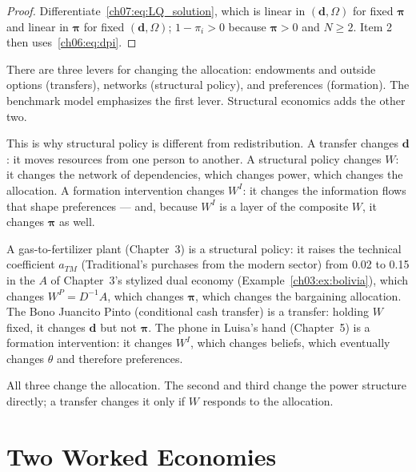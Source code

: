 \documentclass[../structural_economics_book.tex]{subfiles}
\begin{document}
\begin{proof}
Differentiate~\eqref{ch07:eq:LQ_solution}, which is linear in $(\boldsymbol{d}, \Omega)$ for fixed $\boldsymbol{\pi}$ and linear in $\boldsymbol{\pi}$ for fixed $(\boldsymbol{d}, \Omega)$; $1 - \pi_i > 0$ because $\boldsymbol{\pi} > 0$ and $N \geq 2$. Item 2 then uses~\eqref{ch06:eq:dpi}.
\end{proof}

\begin{keyinsight}
There are three levers for changing the allocation: endowments and outside options (transfers), networks (structural policy), and preferences (formation). The benchmark model emphasizes the first lever. Structural economics adds the other two.

This is why structural policy is different from redistribution. A transfer changes $\boldsymbol{d}$: it moves resources from one person to another. A structural policy changes $W$: it changes the network of dependencies, which changes power, which changes the allocation. A formation intervention changes $W^I$: it changes the information flows that shape preferences --- and, because $W^I$ is a layer of the composite $W$, it changes $\boldsymbol{\pi}$ as well.

A gas-to-fertilizer plant (Chapter~3) is a structural policy: it raises the technical coefficient $a_{TM}$ (Traditional's purchases from the modern sector) from 0.02 to 0.15 in the $A$ of Chapter~3's stylized dual economy (Example~\ref{ch03:ex:bolivia}), which changes $W^P = D^{-1}A$, which changes $\boldsymbol{\pi}$, which changes the bargaining allocation. The Bono Juancito Pinto (conditional cash transfer) is a transfer: holding $W$ fixed, it changes $\boldsymbol{d}$ but not $\boldsymbol{\pi}$. The phone in Luisa's hand (Chapter~5) is a formation intervention: it changes $W^I$, which changes beliefs, which eventually changes $\theta$ and therefore preferences.

All three change the allocation. The second and third change the power structure directly; a transfer changes it only if $W$ responds to the allocation.
\end{keyinsight}


\section{Two Worked Economies}
\label{ch07:sec:worked}
\end{document}
